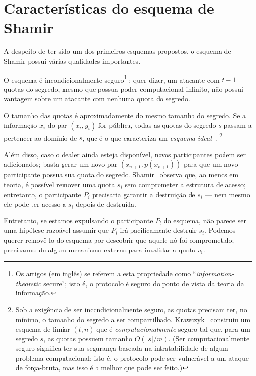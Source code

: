 \documentclass[10pt,twocolumn]{article}
\theoremstyle{definition}
\begin{document}
\section{Características do esquema de Shamir}

A despeito de ter sido um dos primeiros esquemas propostos,
o esquema de Shamir possui várias qualidades importantes.

O esquema é incondicionalmente seguro\footnote{
    Os artigos (em inglês)
    se referem a esta propriedade como
    ``\emph{information-theoretic} secure'';
    isto é,
    o protocolo é seguro do ponto de vista da teoria da informação.
}
\cite{Krawczyk1993};
quer dizer,
um atacante com $t-1$ quotas do segredo,
mesmo que possua poder computacional infinito,
não possui vantagem sobre um atacante com nenhuma quota do segredo.

O tamanho das quotas é aproximadamente do mesmo tamanho do segredo.
Se a informação $x_i$ do par $(x_i, y_i)$ for pública,
todas as quotas do segredo $s$ passam a pertencer ao domínio de $s$,
que é o que caracteriza um \emph{esquema ideal}~\cite{Brickell1990}.
\footnote{
    Sob a exigência de ser incondicionalmente seguro,
    as quotas precisam ter, no mínimo,
    o tamanho do segredo a ser compartilhado.
    Krawczyk~\cite{Krawczyk1993} construiu um esquema de limiar $(t, n)$
    que é \emph{computacionalmente} seguro
    tal que, para um segredo $s$,
    as quotas possuem tamanho $O(|s|/m)$.
    (Ser computacionalmente seguro
    significa ter sua segurança
    baseada na intratabilidade de algum problema computacional;
    isto é,
    o protocolo pode ser vulnerável a um ataque de força-bruta,
    mas isso é o melhor que pode ser feito.)
}

Além disso,
caso o dealer ainda esteja disponível,
novos participantes podem ser adicionados;
basta gerar um novo par $(x_{n+1}, p(x_{n+1}))$
para que um novo participante possua sua quota do segredo.
Shamir~\cite{Shamir1979} observa que,
ao menos em teoria,
é possível remover uma quota $s_i$ sem comprometer a estrutura de acesso;
entretanto,
o participante $P_i$ precisaria garantir a destruição de $s_i$
--- nem mesmo ele pode ter acesso a $s_i$ depois de destruída.

Entretanto,
se estamos expulsando o participante $P_i$ do esquema,
não parece ser uma hipótese razoável
assumir que $P_i$ irá pacificamente destruir $s_i$.
Podemos querer removê-lo do esquema
por descobrir que aquele nó foi comprometido;
precisamos de algum mecanismo externo para invalidar a quota $s_i$.
\end{document}

